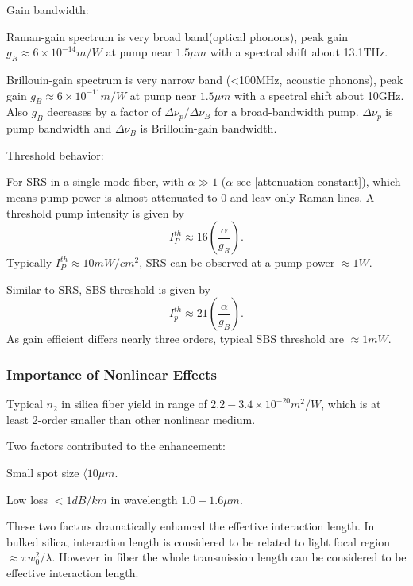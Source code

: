 \documentclass[12pt]{extarticle}
\numberwithin{equation}{section}
\numberwithin{figure}{section}
\numberwithin{table}{section}
\newcommand{\<}{\langle}
\renewcommand{\>}{\rangle}
\theoremstyle{definition}
\newcommand{\SubItem}[1]{
    {\setlength\itemindent{15pt} \item[-] #1}
}
\begin{document}
\begin{itemize}
\begin{figure}[htbp]
                        \label{raman gain spectrum figure}
                    \end{figure}
                \item Gain bandwidth:
                    \SubItem{Raman-gain spectrum is very broad band(optical phonons), peak gain $g_R \approx 6 \times 10^{-14} m/W$ at pump near $1.5 \mu m$ with a spectral shift about 13.1THz.} \SubItem{Brillouin-gain spectrum is very narrow band (<100MHz, acoustic phonons), peak gain $g_B \approx 6 \times 10^{-11} m/W$ at pump near $1.5 \mu m$ with a spectral shift about 10GHz. Also $g_B$ decreases by a factor of $\Delta \nu_p/\Delta \nu_B$ for a broad-bandwidth pump. $\Delta \nu_p$ is pump bandwidth and $\Delta \nu_B$ is Brillouin-gain bandwidth.} 
                \item Threshold behavior:
                    \SubItem{For SRS in a single mode fiber, with $\alpha \gg 1$ ($\alpha$ see \autoref{attenuation constant}), which means pump power is almost attenuated to 0 and leav only Raman lines. A threshold pump intensity is given by \cite{smith_optical_1972}
                    \begin{equation}
                        I_P^{th} \approx 16(\frac{\alpha}{g_R}).
                    \end{equation}
                    Typically $I_P^{th} \approx 10mW/cm^2$, SRS can be observed at a pump power $\approx 1W$.
                    }
                    \SubItem{Similar to SRS, SBS threshold is given by\cite{smith_optical_1972}
                    \begin{equation}
                        I_p^{th} \approx 21(\frac{\alpha}{g_B}).
                    \end{equation}
                    As gain efficient differs nearly three orders, typical SBS threshold are $\approx 1mW$.
                    }
            \end{itemize}
        \subsubsection{Importance of Nonlinear Effects}
             \begin{itemize}
                 \item Typical $n_2$ in silica fiber yield in range of $2.2-3.4 \times 10^{-20} m^2/W$, which is at least 2-order smaller than other nonlinear medium.
                 \item Two factors contributed to the enhancement:
                    \SubItem{Small spot size $\< 10\mu m$.}
                    \SubItem{Low loss $<1dB/km$ in wavelength $1.0-1.6 \mu m$.}
                    
                    These two factors dramatically enhanced the effective interaction length. In bulked silica, interaction length is considered to be related to light focal region $\approx \pi w_0^2/\lambda$. However in fiber the whole transmission length can be considered to be effective interaction length.
             \end{itemize}
\end{document}
